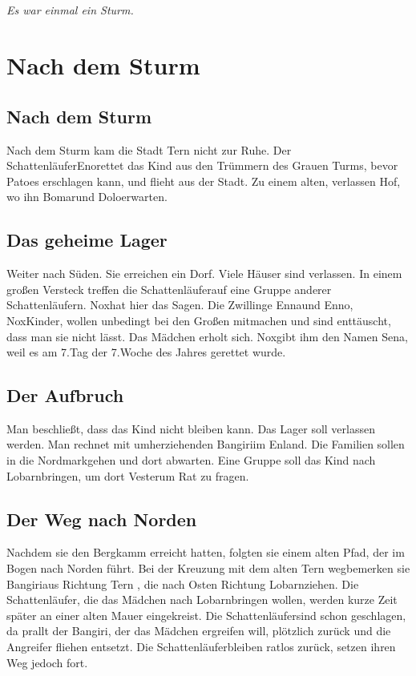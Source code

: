 \documentclass[12pt,a4paper,onecolumn,twoside,ngerman]{book}
\newcommand{\Tern}{Tern }
\newcommand{\Ternweg}{{\Tern}weg}
\newcommand{\Sena}{Sena}
\newcommand{\Bangiri}{Bangiri}
\newcommand{\Pato}{Pato}
\newcommand{\Enland}{Enland}
\newcommand{\Schattenlaufer}{Schattenläufer}
\newcommand{\Eno}{Eno}
\newcommand{\Bomar}{Bomar}
\newcommand{\Dolo}{Dolo}
\newcommand{\Nox}{Nox}
\newcommand{\Enna}{Enna}
\newcommand{\Enno}{Enno}
\newcommand{\Lobarn}{Lobarn}
\newcommand{\Vester}{Vester}
\newcommand{\Nordmark}{Nordmark}
\begin{document}
  
  
  
  \tableofcontents
  


\paragraph{}
\textit{Es war einmal ein Sturm.}

\chapter{Nach dem Sturm}
\section{Nach dem Sturm}
Nach dem Sturm kam die Stadt \Tern nicht zur Ruhe.
Der \Schattenlaufer \Eno rettet das Kind aus den Trümmern des Grauen Turms, bevor \Pato es erschlagen kann, und flieht aus der Stadt. Zu einem alten, verlassen Hof, wo ihn \Bomar und \Dolo erwarten.

\section{Das geheime Lager}
Weiter nach Süden. Sie erreichen ein Dorf. Viele Häuser sind verlassen. In einem großen Versteck treffen die \Schattenlaufer auf eine Gruppe anderer \Schattenlaufer{n}. \Nox hat hier das Sagen. Die Zwillinge \Enna und \Enno , \Nox Kinder, wollen unbedingt bei den Großen mitmachen und sind enttäuscht, dass man sie nicht lässt. Das Mädchen erholt sich. \Nox gibt ihm den Namen \Sena, weil es am 7.Tag der 7.Woche des Jahres gerettet wurde.

\section{Der Aufbruch}
Man beschließt, dass das Kind nicht bleiben kann. Das Lager soll verlassen werden. Man rechnet mit umherziehenden \Bangiri im \Enland . Die Familien sollen in die \Nordmark gehen und dort abwarten. Eine Gruppe soll das Kind nach \Lobarn bringen, um dort \Vester um Rat zu fragen.

\section{Der Weg nach Norden}
Nachdem sie den Bergkamm erreicht hatten, folgten sie einem alten Pfad, der im Bogen nach Norden führt. Bei der Kreuzung mit dem alten \Ternweg bemerken sie \Bangiri aus Richtung \Tern, die nach Osten Richtung \Lobarn ziehen.
Die \Schattenlaufer, die das Mädchen nach \Lobarn bringen wollen, werden kurze Zeit später an einer alten Mauer eingekreist. Die \Schattenlaufer sind schon geschlagen, da prallt der \Bangiri, der das Mädchen ergreifen will, plötzlich zurück und die Angreifer fliehen entsetzt. Die \Schattenlaufer bleiben ratlos zurück, setzen ihren Weg jedoch fort.
\end{document}

